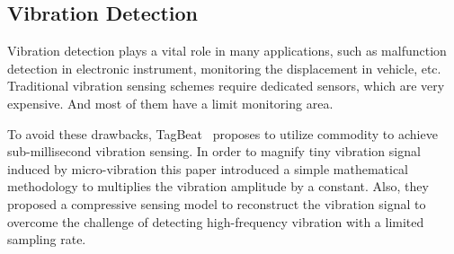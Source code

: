 \subsection{Vibration Detection}   Vibration detection plays a vital role in many applications, such as malfunction detection in electronic instrument,
monitoring the displacement in vehicle, etc. Traditional vibration sensing schemes require dedicated sensors, which are very expensive. And
most of them have a limit monitoring area.

To avoid these drawbacks, TagBeat~\cite{Tagbeat} proposes to utilize commodity \RFID to achieve sub-millisecond vibration sensing. In order
to magnify tiny vibration signal induced by micro-vibration this paper introduced a simple mathematical methodology to multiplies the
vibration amplitude by a constant. Also, they proposed a compressive sensing model to reconstruct the vibration signal to overcome the
challenge of detecting high-frequency vibration with a limited sampling rate.

